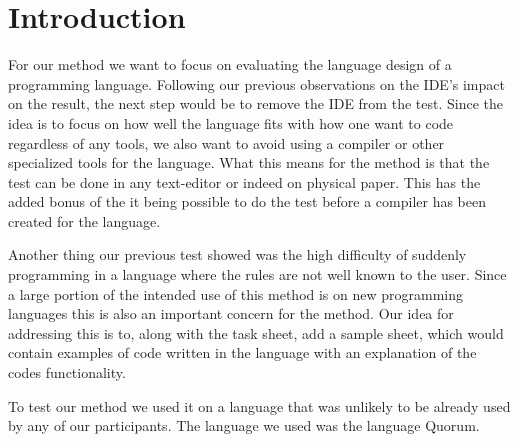 \chapter{Introduction}
For our method we want to focus on evaluating the language design of a programming language.
Following our previous observations on the IDE's impact on the result, the next step would be to remove the IDE from the test.
Since the idea is to focus on how well the language fits with how one want to code regardless of any tools, we also want to avoid using a compiler or other specialized tools for the language.%
What this means for the method is that the test can be done in any text-editor or indeed on physical paper.
This has the added bonus of the it being possible to do the test before a compiler has been created for the language.

Another thing our previous test showed was the high difficulty of suddenly programming in a language where the rules are not well known to the user.
Since a large portion of the intended use of this method is on new programming languages this is also an important concern for the method.
Our idea for addressing this is to, along with the task sheet, add a sample sheet, which would contain examples of code written in the language with an explanation of the codes functionality.

To test our method we used it on a language that was unlikely to be already used by any of our participants.
The language we used was the language Quorum\cite{Quorum}.